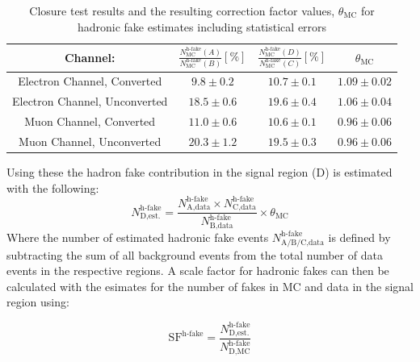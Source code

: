 \begin{table}[h]
\begin{center}
{\renewcommand{\arraystretch}{1.2}
\begin{tabular}{cccc}
\hline
Channel:     &  $\frac{N^\text{h-fake}_\text{MC} (A)}{N^\text{h-fake}_\text{MC} (B)} [\%]$   &   $\frac{N^\text{h-fake}_\text{MC} (D)}{N^\text{h-fake}_\text{MC} (C)} [\%]$ & $\theta_\text{MC}$\\  \hline 
Electron Channel, Converted    & $9.8\pm0.2$   & $10.7\pm 0.1$  & $1.09\pm0.02$	\\ 
Electron Channel, Unconverted & $18.5\pm 0.6$	& $19.6\pm 0.4$   & $1.06 \pm 0.04$\\
Muon Channel, Converted	        &	 $11.0\pm 0.6$	& $10.6\pm 0.1$  & $0.96\pm 0.06$\\
Muon Channel, Unconverted     &  $20.3\pm 1.2$   & $19.5\pm 0.3$   & $0.96 \pm 0.06$       \\ \hline 
\end{tabular}
\caption{Closure test results and the resulting correction factor values, $\theta_\text{MC}$ for hadronic fake estimates including statistical errors }
\label{tab:abcdTheta}
}
\end{center}
\end{table}

 Using these the hadron fake contribution in the signal region (D) is estimated with the following:
\[N_\text{D,est.}^{\text{h-fake}} = \frac{N_\text{A,data}^{\text{h-fake}}\times N_\text{C,data}^{\text{h-fake}}}{N_\text{B,data}^{\text{h-fake}}}\times \theta_\text{MC}
\]
Where the number of estimated hadronic fake events $N_\text{A/B/C,data}^\text{h-fake}$ is defined by subtracting the sum of all background events from the total number of data events in the respective regions.  A scale factor for hadronic fakes can then be calculated with the esimates for the number of fakes in MC and data in the signal region using:

\[\text{SF}^\text{h-fake} = \frac{N^\text{h-fake}_\text{D,est.}}{N^\text{h-fake}_\text{D,MC}}
\]

